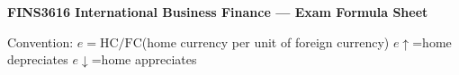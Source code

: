 \documentclass[7.5pt,a4paper]{article}
\begin{document}
\pagestyle{empty}
\color{TextGrey}
\fontsize{6.6}{8}\selectfont

\noindent
\colorbox{HeadingColor}{%
  \parbox{\dimexpr\linewidth-4pt}{%
    \vspace{1pt}\centering
    \color{white}\bfseries\fontsize{8.5}{10}\selectfont
    FINS3616 International Business Finance --- Exam Formula Sheet\par
    \vspace{0.5pt}
    \fontsize{6.5}{8}\selectfont\normalfont\color{white}
    Convention: $e = \text{HC}/\text{FC}$\enspace (home currency per unit of foreign currency)\quad
    $e\uparrow$=home depreciates \quad $e\downarrow$=home appreciates
    \vspace{1pt}
  }%
}

\vspace{2pt}
\end{document}
